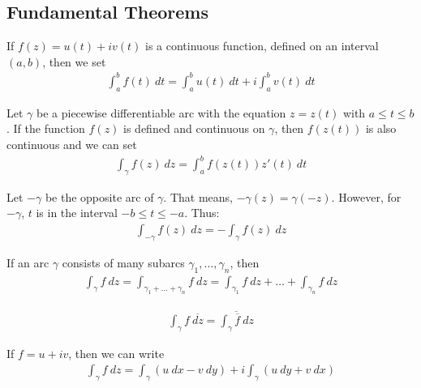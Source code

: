 \subsection{Fundamental Theorems}

\begin{theorem}
    If $f(z) = u(t) + i v(t)$ is a continuous function, defined on an interval $(a,b)$,
    then we set
    \begin{align*}
        \int_a^b f(t) \ dt = \int_a^b u(t) \ dt + i \int_a^b v(t) \ dt
    \end{align*}
\end{theorem}

\begin{theorem}
    Let $\gamma$ be a piecewise differentiable arc with the equation $z = z(t)$
    with $a \leq t \leq b$. If the function $f(z)$ is defined and continuous
    on $\gamma$, then $f(z(t))$ is also continuous and we can set
    \begin{align*}
        \int_\gamma f(z) \ dz = \int_a^b f(z(t)) z'(t) \ dt
    \end{align*}
\end{theorem}

\begin{theorem}
    Let $-\gamma$ be the opposite arc of $\gamma$. That means, $-\gamma(z) = \gamma(-z)$.
    However, for $-\gamma$, $t$ is in the interval $-b \leq t \leq -a$. Thus:
    \begin{align*}
        \int_{-\gamma} f(z) \ dz = - \int_\gamma f(z) \ dz
    \end{align*}
\end{theorem}

\begin{theorem}
    If an arc $\gamma$ consists of many subarcs $\gamma_1,\dots,\gamma_n$, then
    \begin{align*}
        \int_\gamma f \ dz = \int_{\gamma_1 + \dots + \gamma_n} f \ dz
        = \int_{\gamma_1} f \ dz + \dots + \int_{\gamma_n} f \ dz
    \end{align*}
\end{theorem}

\begin{theorem}
    \begin{align*}
        \int_\gamma f \ \overline{dz} = \overline{\int_\gamma \overline{f} \ dz}
    \end{align*}
\end{theorem}

\begin{theorem}
    If $f = u + i v$, then we can write
    \begin{align*}
        \int_\gamma f \ dz = \int_\gamma (u \ dx - v \ dy) + i \int_\gamma (u \ dy + v \ dx)
    \end{align*}
\end{theorem}

